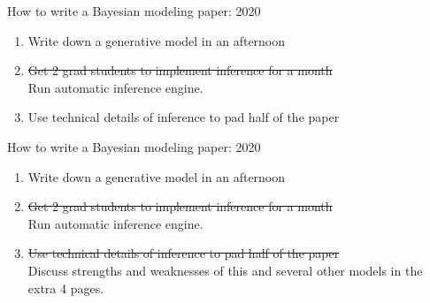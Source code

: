 \begin{frame}{How to write a Bayesian modeling paper: 2020}
  \begin{block}{}
    \begin{enumerate}
      \item Write down a generative model in an afternoon
      \vspace{\baselineskip}
      \vspace{\baselineskip}
      \item \sout{Get 2 grad students to implement inference for a month} 
      \\ Run automatic inference engine.
      \vspace{\baselineskip}
      \vspace{\baselineskip}
      \item Use technical details of inference to pad half of the paper
    \end{enumerate}
  \end{block}
\end{frame}

\begin{frame}{How to write a Bayesian modeling paper: 2020}
  \begin{block}{}
    \begin{enumerate}
      \item Write down a generative model in an afternoon
      \vspace{\baselineskip}
      \vspace{\baselineskip}
      \item \sout{Get 2 grad students to implement inference for a month} 
      \\Run automatic inference engine.
      \vspace{\baselineskip}
      \vspace{\baselineskip}
      \item \sout{Use technical details of inference to pad half of the paper}
      \\ Discuss strengths and weaknesses of this and several other models in the extra 4 pages.
    \end{enumerate}
  \end{block}
\end{frame}






